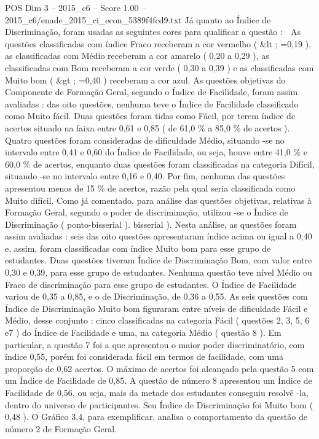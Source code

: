 \begin{textsample}{POS Dim 3 – 2015\_c6 – Score 1.00 – 2015\_c6/enade\_2015\_ci\_econ\_5389f4fcd9.txt}
Já quanto ao Índice de Discriminação, foram usadas as seguintes cores para qualificar a questão :  As questões classificadas com índice Fraco receberam a cor vermelho ( \&lt ; =0,19 ), as classificadas com Médio receberam a cor amarelo ( 0,20 a 0,29 ), as classificadas com Bom receberam a cor verde ( 0,30 a 0,39 ) e as classificadas com Muito bom ( \&gt ; =0,40 ) receberam a cor azul.
As questões objetivas do Componente de Formação Geral, segundo o Índice de Facilidade, foram assim avaliadas : das oito questões, nenhuma teve o Índice de Facilidade classificado como Muito fácil.
Duas questões foram tidas como Fácil, por terem índice de acertos situado na faixa entre 0,61 e 0,85 ( de 61,0 \% a 85,0 \% de acertos ).
Quatro questões foram consideradas de dificuldade Médio, situando -se no intervalo entre 0,41 e 0,60 do Índice de Facilidade, ou seja, houve entre 41,0 \% e 60,0 \% de acertos, enquanto duas questões foram classificadas na categoria Difícil, situando -se no intervalo entre 0,16 e 0,40.
Por fim, nenhuma das questões apresentou menos de 15 \% de acertos, razão pela qual seria classificada como Muito difícil.
Como já comentado, para análise das questões objetivas, relativas à Formação Geral, segundo o poder de discriminação, utilizou -se o Índice de Discriminação ( ponto-bisserial ). bisserial ).
Nesta análise, as questões foram assim avaliadas : seis das oito questões apresentaram índice acima ou igual a 0,40 e, assim, foram classificadas com índice Muito bom para esse grupo de estudantes.
Duas questões tiveram Índice de Discriminação Bom, com valor entre 0,30 e 0,39, para esse grupo de estudantes.
Nenhuma questão teve nível Médio ou Fraco de discriminação para esse grupo de estudantes.
O Índice de Facilidade variou de 0,35 a 0,85, e o de Discriminação, de 0,36 a 0,55.
As seis questões com Índice de Discriminação Muito bom figuraram entre níveis de dificuldade Fácil e Médio, desse conjunto : cinco classificadas na categoria Fácil ( questões 2, 3, 5, 6 e7 ) do Índice de Facilidade e uma, na categoria Médio ( questão 8 ).
Em particular, a questão 7 foi a que apresentou o maior poder discriminatório, com índice 0,55, porém foi considerada fácil em termos de facilidade, com uma proporção de 0,62 acertos.
O máximo de acertos foi alcançado pela questão 5 com um Índice de Facilidade de 0,85.
A questão de número 8 apresentou um Índice de Facilidade de 0,56, ou seja, mais da metade dos estudantes conseguiu resolvê -la, dentro do universo de participantes.
Seu Índice de Discriminação foi Muito bom ( 0,48 ).
O Gráfico 3.4, para exemplificar, analisa o comportamento da questão de número 2 de Formação Geral.

\end{textsample}
